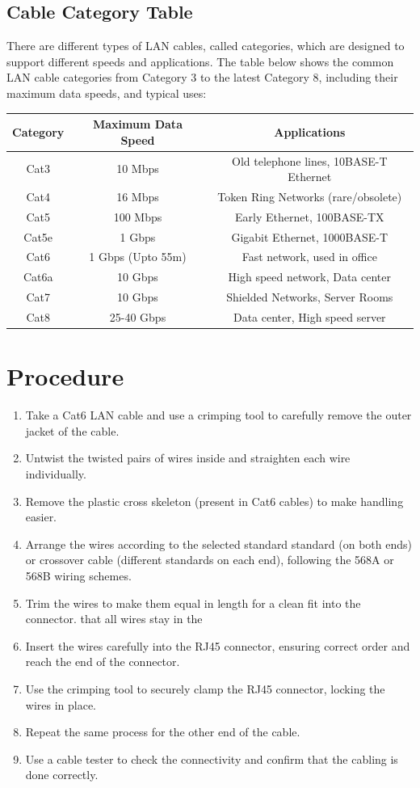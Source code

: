 \documentclass[a4paper]{article}
\begin{document}
\subsection{Cable Category Table}
There are different types of LAN cables, called categories, which are designed to support different speeds and applications. The table below shows the common LAN cable categories from Category 3 to the latest Category 8, including their maximum data speeds, and typical uses:\\
\begin{tabular}{|c|c|c|}
    \hline
     Category & Maximum Data Speed & Applications  \\ \hline
     Cat3 & 10 Mbps & Old telephone lines, 10BASE-T Ethernet \\
     Cat4 & 16 Mbps & Token Ring Networks (rare/obsolete) \\
     Cat5 & 100 Mbps & Early Ethernet, 100BASE-TX \\
     Cat5e & 1 Gbps & Gigabit Ethernet, 1000BASE-T \\
     Cat6 & 1 Gbps (Upto 55m) & Fast network, used in office \\
     Cat6a & 10 Gbps & High speed network, Data center \\
     Cat7 & 10 Gbps & Shielded Networks, Server Rooms \\
     Cat8 & 25-40 Gbps & Data center, High speed server \\ \hline
\end{tabular}
\section{Procedure}
\begin{enumerate}
    \item Take a Cat6 LAN cable and use a crimping tool to carefully remove the outer jacket of the cable.
    \item Untwist the twisted pairs of wires inside and straighten each wire individually.
    \item Remove the plastic cross skeleton (present in Cat6 cables) to make handling easier.
    \item Arrange the wires according to the selected standard standard (on both ends) or crossover cable (different standards on each end), following the 568A or 568B wiring schemes.
    \item Trim the wires to make them equal in length for a clean fit into the connector. that all wires stay in the
    \item Insert the wires carefully into the RJ45 connector, ensuring correct order and reach the end of the connector.
    \item Use the crimping tool to securely clamp the RJ45 connector, locking the wires in place.
    \item Repeat the same process for the other end of the cable.
    \item Use a cable tester to check the connectivity and confirm that the cabling is done correctly.
\end{enumerate}
\end{document}
